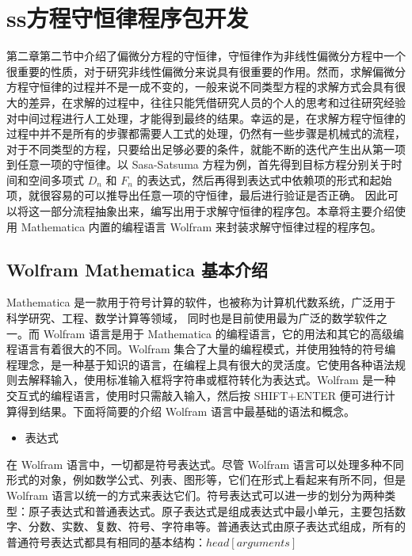 
\chapter{ss方程守恒律程序包开发}
第二章第二节中介绍了偏微分方程的守恒律，守恒律作为非线性偏微分方程中一个很重要的性质，对于研究非线性偏微分来说具有很重要的作用。然而，求解偏微分方程守恒律的过程并不是一成不变的，一般来说不同类型方程的求解方式会具有很大的差异，在求解的过程中，往往只能凭借研究人员的个人的思考和过往研究经验对中间过程进行人工处理，才能得到最终的结果。幸运的是，在求解方程守恒律的过程中并不是所有的步骤都需要人工式的处理，仍然有一些步骤是机械式的流程，对于不同类型的方程，只要给出足够必要的条件，就能不断的迭代产生出从第一项到任意一项的守恒律。以 Sasa-Satsuma 方程为例，首先得到目标方程分别关于时间和空间多项式 $D_n$ 和 $F_n$ 的表达式，然后再得到表达式中依赖项的形式和起始项，就很容易的可以推导出任意一项的守恒律，最后进行验证是否正确。 因此可以将这一部分流程抽象出来，编写出用于求解守恒律的程序包。本章将主要介绍使用 Mathematica 内置的编程语言 Wolfram 来封装求解守恒律过程的程序包。

\section{Wolfram Mathematica 基本介绍}
Mathematica 是一款用于符号计算的软件，也被称为计算机代数系统，广泛用于科学研究、工程、数学计算等领域， 同时也是目前使用最为广泛的数学软件之一。而 Wolfram 语言是用于 Mathematica 的编程语言，它的用法和其它的高级编程语言有着很大的不同。Wolfram 集合了大量的编程模式，并使用独特的符号编程理念，是一种基于知识的语言，在编程上具有很大的灵活度。它使用各种语法规则去解释输入，使用标准输入框将字符串或框符转化为表达式。Wolfram 是一种交互式的编程语言，使用时只需敲入输入，然后按 SHIFT+ENTER 便可进行计算得到结果。下面将简要的介绍 Wolfram 语言中最基础的语法和概念。
\begin{itemize}
    \item 表达式
\end{itemize}

在 Wolfram 语言中，一切都是符号表达式。尽管 Wolfram 语言可以处理多种不同形式的对象，例如数学公式、列表、图形等，它们在形式上看起来有所不同，但是 Wolfram 语言以统一的方式来表达它们。符号表达式可以进一步的划分为两种类型：原子表达式和普通表达式。原子表达式是组成表达式中最小单元，主要包括数字、分数、实数、复数、符号、字符串等。普通表达式由原子表达式组成，所有的普通符号表达式都具有相同的基本结构：$head[arguments]$

